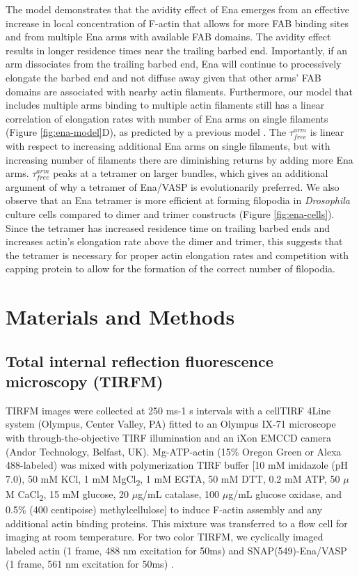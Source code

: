 The model demonstrates that the avidity effect of Ena emerges from an effective increase in local concentration of F-actin that allows for more FAB binding sites and from multiple Ena arms with available FAB domains. The avidity effect results in longer residence times near the trailing barbed end. Importantly, if an arm dissociates from the trailing barbed end, Ena will continue to processively elongate the barbed end and not diffuse away given that other arms' FAB domains are associated with nearby actin filaments. Furthermore, our model that includes multiple arms binding to multiple actin filaments still has a linear correlation of elongation rates with number of Ena arms on single filaments (Figure \ref{fig:ena-model}D), as predicted by a previous model \citep{breitsprecher_molecular_2011}. The $\tau_{free}^{arm}$ is linear with respect to increasing additional Ena arms on single filaments, but with increasing number of filaments there are diminishing returns by adding more Ena arms. $\tau_{free}^{arm}$ peaks at a tetramer on larger bundles, which gives an additional argument of why a tetramer of Ena/VASP is evolutionarily preferred. We also observe that an Ena tetramer is more efficient at forming filopodia in \textit{Drosophila} culture cells compared to dimer and trimer constructs (Figure \ref{fig:ena-cells}). Since the tetramer has increased residence time on trailing barbed ends and increases actin's elongation rate above the dimer and trimer, this suggests that the tetramer is necessary for proper actin elongation rates and competition with capping protein to allow for the formation of the correct number of filopodia. 

\section{Materials and Methods}\label{ch02-materials-methods}

\subsection{Total internal reflection fluorescence microscopy (TIRFM)}\label{ena-mm-tirf}

TIRFM images were collected at 250 ms-1 s intervals with a cellTIRF 4Line system (Olympus, Center Valley, PA) fitted to an Olympus IX-71 microscope with through-the-objective TIRF illumination and an iXon EMCCD camera (Andor Technology, Belfast, UK). Mg-ATP-actin (15\% Oregon Green or Alexa 488-labeled) was mixed with polymerization TIRF buffer [10 mM imidazole (pH 7.0), 50 mM KCl, 1 mM MgCl\textsubscript{2}, 1 mM EGTA, 50 mM DTT, 0.2 mM ATP, 50 $\mu$M CaCl\textsubscript{2}, 15 mM glucose, 20 $\mu$g/mL catalase, 100 $\mu$g/mL glucose oxidase, and 0.5\% (400 centipoise) methylcellulose] to induce F-actin assembly and any additional actin binding proteins. This mixture was transferred to a flow cell for imaging at room temperature. For two color TIRFM, we cyclically imaged labeled actin (1 frame, 488 nm excitation for 50ms) and SNAP(549)-Ena/VASP (1 frame, 561 nm excitation for 50ms) \citep{winkelman_ena/vasp_2014}.

